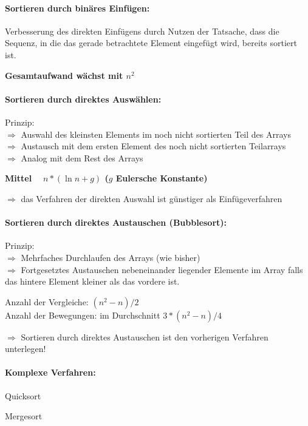 \paragraph{Sortieren durch binäres Einfügen:}
Verbesserung des direkten Einfügens durch Nutzen der Tatsache, dass die Sequenz, in die das gerade betrachtete Element eingefügt wird, bereits sortiert ist.

{\bf Gesamtaufwand wächst mit $n^2$}

\paragraph{Sortieren durch direktes Auswählen:} Prinzip:\\
$\Rightarrow$ Auswahl des kleinsten Elements im noch nicht sortierten Teil des Arrays\\
$\Rightarrow$ Austausch mit dem ersten Element des noch nicht sortierten Teilarrays\\
$\Rightarrow$ Analog mit dem Rest des Arrays

{\bf Mittel ~ $n*(\ln n +g)$ ($g$ Eulersche Konstante)}

$\Rightarrow$ das Verfahren der direkten Auswahl ist günstiger als Einfügeverfahren

\paragraph{Sortieren durch direktes Austauschen (Bubblesort):}
Prinzip:\\
$\Rightarrow$ Mehrfaches Durchlaufen des Arrays (wie bisher)\\
$\Rightarrow$ Fortgesetztes Austauschen nebeneinander liegender Elemente im Array falls das hintere Element kleiner als das vordere ist.

Anzahl der Vergleiche: $(n^2-n)/2$\\
Anzahl der Bewegungen: im Durchschnitt $3*(n^2-n)/4$

$\Rightarrow$ Sortieren durch direktes Austauschen ist den vorherigen Verfahren unterlegen!

\paragraph{Komplexe Verfahren:}
\begin{compactitem}
	\item Quicksort
	\item Mergesort
\end{compactitem}

